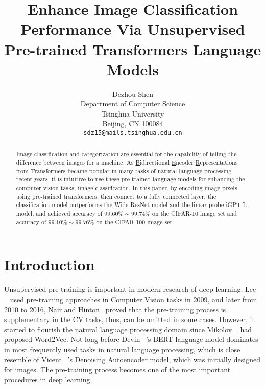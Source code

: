 \documentclass[review]{cvpr}
\begin{document}
\title{Enhance Image Classification Performance Via Unsupervised Pre-trained Transformers Language Models}

\author{Dezhou Shen\\
Department of Computer Science\\
Tsinghua University\\
Beijing, CN 100084\\
{\tt\small sdz15@mails.tsinghua.edu.cn}
}

\maketitle


\begin{abstract}

  Image classification and categorization are essential for the capability of telling the difference between images for a machine.
  As \underline{B}idirectional \underline{E}ncoder \underline{R}epresentations from \underline{T}ransformers became popular in many tasks of natural language processing recent years,
  it is intuitive to use these pre-trained language models for enhancing the computer vision tasks, \eg image classification.
  In this paper, by encoding image pixels using pre-trained transformers, then connect to a fully connected layer,
  the classification model outperforms the Wide ResNet model and the linear-probe iGPT-L model,
  and achieved accuracy of $99.60\%\sim99.74\%$ on the CIFAR-10 image set and accuracy of $99.10\%\sim99.76\%$ on the CIFAR-100 image set.

\end{abstract}

\section{Introduction}

  Unsupervised pre-training is important in modern research of deep learning.
  Lee \etal~\cite{lee2009convolutional} used pre-training approaches
  in Computer Vision tasks in 2009, and later from 2010 to 2016, Nair and Hinton~\cite{nair2010rectified} proved that the pre-training process is supplementary in the CV tasks,
  thus, can be omitted in some cases.
  However, it started to flourish the natural language processing domain since Mikolov \etal~\cite{mikolov2013distributed} had proposed Word2Vec.
  Not long before Devin \etal~\cite{devlin2019bert}'s BERT language model dominates in most frequently used tasks in natural language processing,
  which is close resemble of Vicent \etal~\cite{vincent2008extracting}'s Denoising Autoencoder model, which was initially designed for images.
  The pre-training process becomes one of the most important procedures in deep learning.
\end{document}
